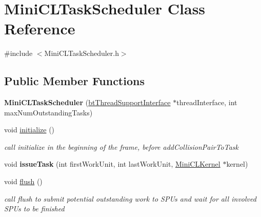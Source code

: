 \hypertarget{classMiniCLTaskScheduler}{}\section{Mini\+C\+L\+Task\+Scheduler Class Reference}
\label{classMiniCLTaskScheduler}


{\ttfamily \#include $<$Mini\+C\+L\+Task\+Scheduler.\+h$>$}

\subsection*{Public Member Functions}
\begin{DoxyCompactItemize}
\item 
\mbox{\label{classMiniCLTaskScheduler_a3fd2147fd33425ec936e49a898a4f6d0}} 
{\bfseries Mini\+C\+L\+Task\+Scheduler} (\hyperlink{classbtThreadSupportInterface}{bt\+Thread\+Support\+Interface} $\ast$thread\+Interface, int max\+Num\+Outstanding\+Tasks)
\item 
\mbox{\label{classMiniCLTaskScheduler_ae3dbcee1e36753aac47327d035560f10}} 
void \hyperlink{classMiniCLTaskScheduler_ae3dbcee1e36753aac47327d035560f10}{initialize} ()
\begin{DoxyCompactList}\small\item\em call initialize in the beginning of the frame, before add\+Collision\+Pair\+To\+Task \end{DoxyCompactList}\item 
\mbox{\label{classMiniCLTaskScheduler_accd5680fa809616919d83df8e959cb90}} 
void {\bfseries issue\+Task} (int first\+Work\+Unit, int last\+Work\+Unit, \hyperlink{structMiniCLKernel}{Mini\+C\+L\+Kernel} $\ast$kernel)
\item 
\mbox{\label{classMiniCLTaskScheduler_aaaaefcab8688c6c73792b9786f700873}} 
void \hyperlink{classMiniCLTaskScheduler_aaaaefcab8688c6c73792b9786f700873}{flush} ()
\begin{DoxyCompactList}\small\item\em call flush to submit potential outstanding work to S\+P\+Us and wait for all involved S\+P\+Us to be finished \end{DoxyCompactList}\item 

\end{DoxyCompactItemize}

